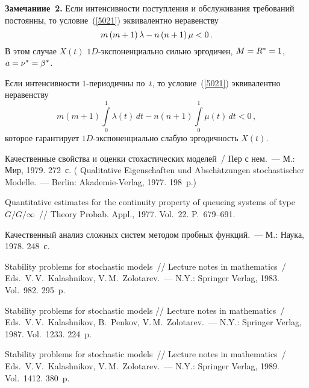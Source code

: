 \begin{multicols}{2}
\medskip

\noindent
\textbf{Замечаниие~2.}
Если интенсивности поступления и обслуживания требований постоянны, то условие~(\ref{5021})
эквивалентно неравенству
\begin{equation*}
 m\left(m+1\right)\lambda - n\left(n+1\right)\mu < 0\,.
\end{equation*}
В этом случае $X(t)$  $1D$-экс\-по\-нен\-ци\-аль\-но
сильно эргодичен, $M\hm=R^* \hm=1$, $a\hm = \nu^*\hm= \beta^*$.

\smallskip

Если интенсивности  $1$-пе\-ри\-о\-дич\-ны по~$t$, то условие~(\ref{5021})
эквивалентно неравенству
\begin{equation*}
m\left(m+1\right)\int\limits_0^1\lambda(t) \, dt  - n\left(n+1\right)
\int\limits_0^1\mu(t) \, dt < 0\,,
\end{equation*}
которое гарантирует $1D$-экс\-по\-нен\-ци\-аль\-но слабую эргодичность $X(t)$.

{\small\frenchspacing
{%
\begin{thebibliography}{99}



 Качественные свойства и оценки стохастических моделей~/
Пер с нем.~--- М.: Мир, 1979. 272~с.
( Qualitative Eigenschaften und Absch$\ddot{\mbox{a}}$tzungen
stochastischer Modelle.~--- Berlin: Akademie-Verlag, 1977. 198~p.)


 Quantitative estimates for the continuity property
of queueing systems of type $G/G/\infty$~// Theory Probab. Appl., 1977. Vol.~22. P.~679--691.

Качественный анализ сложных сис\-тем методом пробных функций.~--- М.: Наука, 1978. 248~с.


Stability problems for stochastic models~// Lecture notes in
mathematics~/
Eds.\ V.\,V.~Kalashnikov, V.\,M.~Zolotarev.~--- N.Y.: Springer Verlag, 1983. Vol.~982. 295~p.

Stability problems for stochastic models // Lecture notes in
mathematics~/ Eds.\ V.\,V.~Kalashnikov, B.~Penkov, V.\,M.~Zolotarev.~--- 
N.Y.: Springer Verlag, 1987. Vol.~1233. 224~p.

Stability problems for stochastic models~// Lecture notes in mathematics~/
Eds.\ V.\,V.~Kalashnikov, V.\,M.~Zolotarev.~--- N.Y.: Springer Verlag, 1989. Vol.~1412. 380~p.


\end{thebibliography}}}
\end{multicols}
